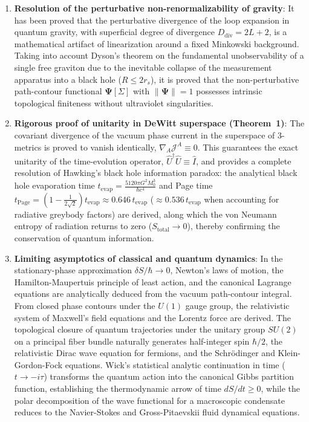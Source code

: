 \documentclass[11pt,a4paper]{article}
\theoremstyle{definition}
\begin{document}
\begin{enumerate}
\item \textbf{Resolution of the perturbative non-renormalizability of gravity}: It has been proved that the perturbative divergence of the loop expansion in quantum gravity, with superficial degree of divergence $D_{\text{div}} = 2L + 2$, is a mathematical artifact of linearization around a fixed Minkowski background. Taking into account Dyson's theorem on the fundamental unobservability of a single free graviton due to the inevitable collapse of the measurement apparatus into a black hole ($R \le 2 r_s$), it is proved that the non-perturbative path-contour functional $\mathbf{\Psi}[\Sigma]$ with $\|\mathbf{\Psi}\| = 1$ possesses intrinsic topological finiteness without ultraviolet singularities.

\item \textbf{Rigorous proof of unitarity in DeWitt superspace (Theorem~1)}: The covariant divergence of the vacuum phase current in the superspace of 3-metrics is proved to vanish identically, $\nabla_A \mathcal{J}^A \equiv 0$. This guarantees the exact unitarity of the time-evolution operator, $\hat{U}^\dagger \hat{U} \equiv \hat{I}$, and provides a complete resolution of Hawking's black hole information paradox: the analytical black hole evaporation time $t_{\text{evap}} = \frac{5120\pi G^2 M_0^3}{\hbar c^4}$ and Page time $t_{\text{Page}} = \left( 1 - \frac{1}{2\sqrt{2}} \right) t_{\text{evap}} \approx 0.646\,t_{\text{evap}}$ ($\approx 0.536\,t_{\text{evap}}$ when accounting for radiative greybody factors) are derived, along which the von Neumann entropy of radiation returns to zero ($S_{\text{total}} \to 0$), thereby confirming the conservation of quantum information.

\item \textbf{Limiting asymptotics of classical and quantum dynamics}: In the stationary-phase approximation $\delta S / \hbar \to 0$, Newton's laws of motion, the Hamilton-Maupertuis principle of least action, and the canonical Lagrange equations are analytically deduced from the vacuum path-contour integral. From closed phase contours under the $U(1)$ gauge group, the relativistic system of Maxwell's field equations and the Lorentz force are derived. The topological closure of quantum trajectories under the unitary group $SU(2)$ on a principal fiber bundle naturally generates half-integer spin $\hbar/2$, the relativistic Dirac wave equation for fermions, and the Schrödinger and Klein-Gordon-Fock equations. Wick's statistical analytic continuation in time ($t \to -i\tau$) transforms the quantum action into the canonical Gibbs partition function, establishing the thermodynamic arrow of time $dS/dt \ge 0$, while the polar decomposition of the wave functional for a macroscopic condensate reduces to the Navier-Stokes and Gross-Pitaevskii fluid dynamical equations.


\end{enumerate}
\end{document}
